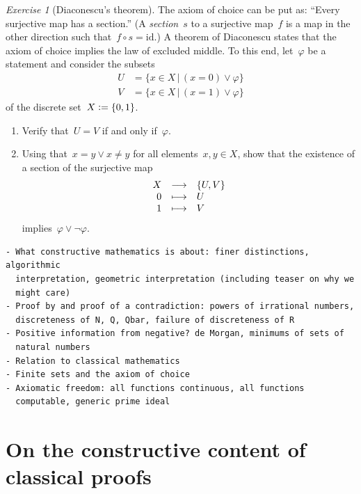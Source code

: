 \documentclass[10pt,reqno,a4paper,openany]{amsbook}
\theoremstyle{definition}
\theoremstyle{plain}
\theoremstyle{remark}
\newcommand{\?}{\,{:}\,}
\renewcommand{\_}{\mathpunct{.}\,}
\newcommand{\defeq}{\vcentcolon=}
\newtheorem{exercise}[defn]{Exercise}
\begin{document}
\begin{exercise}[Diaconescu's theorem]
\label{ex:diaconescu}
The axiom of choice can be put as: ``Every surjective map has a
section.'' (A \emph{section}~$s$ to a surjective map~$f$ is a map in the other direction such that~$f \circ s =
\mathrm{id}$.) A theorem of Diaconescu states that
the axiom of choice implies the law of excluded middle. To this end, let~$\varphi$ be a
statement and consider the subsets
\begin{align*}
  U &= \{ x \in X \,|\, (x = 0) \vee \varphi \} \\
  V &= \{ x \in X \,|\, (x = 1) \vee \varphi \}
\end{align*}
of the discrete set~$X \defeq \{ 0,1 \}$.
\begin{enumerate}
\item Verify that~$U = V$ if and only if~$\varphi$.
\item Using that~$x = y \vee x \neq y$ for all elements~$x,y \in X$, show that
the existence of a section of the surjective map
\[ \begin{array}{@{}rcl@{}}
  X &\longrightarrow& \{U,V\} \\
  0 &\longmapsto& U \\
  1 &\longmapsto& V
\end{array} \]
implies~$\varphi \vee \neg\varphi$.
\end{enumerate}
\end{exercise}

\vfill
{\small
\begin{verbatim}
- What constructive mathematics is about: finer distinctions, algorithmic
  interpretation, geometric interpretation (including teaser on why we
  might care)
- Proof by and proof of a contradiction: powers of irrational numbers,
  discreteness of N, Q, Qbar, failure of discreteness of R
- Positive information from negative? de Morgan, minimums of sets of
  natural numbers
- Relation to classical mathematics
- Finite sets and the axiom of choice
- Axiomatic freedom: all functions continuous, all functions
  computable, generic prime ideal
\end{verbatim}
}


\chapter{On the constructive content of classical proofs}
\end{document}
